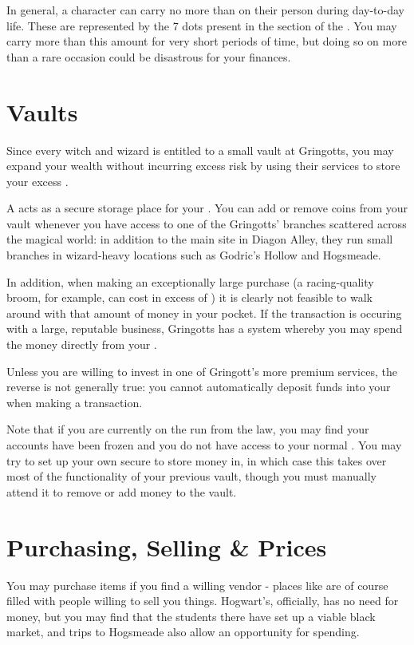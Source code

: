 In general, a character can carry no more than  on their person during day-to-day life. These are represented by the 7  dots present in the  section of the . You may carry more than this amount for very short periods of time, but doing so on more than a rare occasion could be disastrous for your finances.


\section{Vaults}
Since every witch and wizard is entitled to a small vault at Gringotts, you may expand your wealth without incurring excess risk by using their services to store your excess . 

A  acts as a secure storage place for your . You can add or remove coins from your vault whenever you have access to one of the Gringotts' branches scattered across the magical world: in addition to the main site in Diagon Alley, they run small branches in wizard-heavy locations such as Godric's Hollow and Hogsmeade.  

In addition, when making an exceptionally large purchase (a racing-quality broom, for example, can cost in excess of ) it is clearly not feasible to walk around with that amount of money in your pocket. If the transaction is occuring with a large, reputable business, Gringotts has a system whereby you may spend the money directly from your . 

Unless you are willing to invest in one of Gringott's more premium services, the reverse is not generally true: you cannot automatically deposit funds into your  when making a transaction.  


Note that if you are currently on the run from the law, you may find your accounts have been frozen and you do not have access to your normal . You may try to set up your own secure  to store money in, in which case this takes over most of the functionality of your previous vault, though you must manually attend it to remove or add money to the vault.

\section{Purchasing, Selling \& Prices}


You may purchase items if you find a willing vendor - places like  are of course filled with people willing to sell you things. Hogwart's, officially, has no need for money, but you may find that the students there have set up a viable black market, and trips to Hogsmeade also allow an opportunity for spending. 


